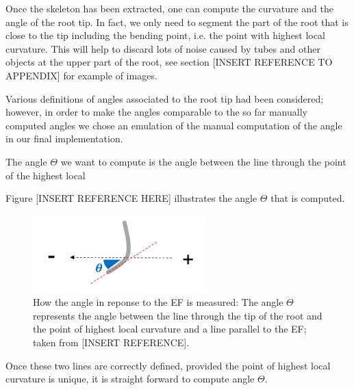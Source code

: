 Once the skeleton has been extracted, one can compute the curvature and the angle of the root tip. 
In fact, we only need to segment the part of the root that is close to the tip including the bending point, i.e. the point with highest local curvature. %
This will help to discard lots of noise caused by tubes and other objects at the upper part of the root, see section [INSERT REFERENCE TO APPENDIX] for example of images.

Various definitions of angles associated to the root tip had been considered; however, in order to make the angles comparable to the so far manually computed angles we chose an emulation of the manual computation of the angle in our final implementation. 



The angle \( \Theta \) we want to compute is the angle between the line through the point of the highest local %

Figure [INSERT REFERENCE HERE] illustrates the angle \( \Theta \) that is computed. 


\begin{figure}[H]
	\centering
	\includegraphics[width=0.6\textwidth]{../Figures/angle.png}
	\caption{How the angle in reponse to the EF is measured: The angle \( \Theta \) represents the angle between the line through the tip of the root and the point of highest local curvature and a line parallel to the EF; taken from [INSERT REFERENCE].}
	\label{fig:angle}
\end{figure}



Once these two lines are correctly defined, provided the point of highest local curvature is unique, it is straight forward to compute angle \( \Theta \).


